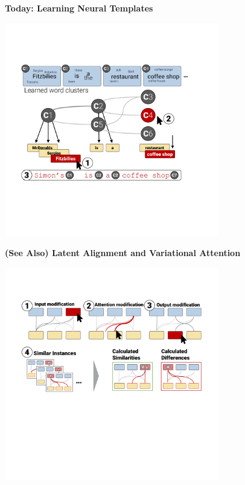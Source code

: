 \documentclass[aspectratio=169]{beamer}
\begin{document}
\begin{frame}
  \begin{center}
    \textbf{Today: Learning Neural Templates}
  \end{center}

  \begin{center}
    \includegraphics[width=0.7\textwidth]{DecoderVis}
  \end{center}
\end{frame}

\begin{frame}
  \begin{center}
    \textbf{(See Also) Latent Alignment and Variational Attention}


  \end{center}

  \begin{center}
    \includegraphics[width=0.7\textwidth]{AttentionVIS}
  \end{center}
\end{frame}
\end{document}
